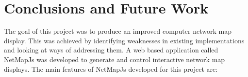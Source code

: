 \documentclass[11pt, a4paper]{article}
\begin{document}
\newpage


\section{Conclusions and Future Work}
\label{sec:conclusion}

  
  


The goal of this project was to produce an improved computer network map
display. This was achieved by identifying weaknesses in existing implementations
and looking at ways of addressing them. A web based application called NetMapJs
was developed to generate and control interactive network map displays. The main
features of NetMapJs developed for this project are:
\end{document}
